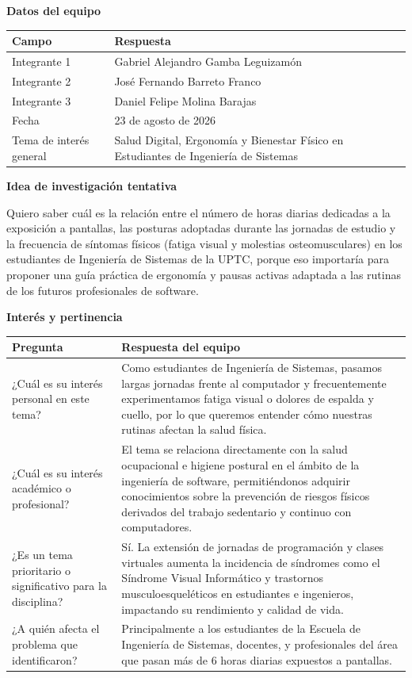 \documentclass[12pt,letterpaper]{article}
\begin{document}
\bigskip
\noindent\textbf{Datos del equipo}
\begin{center}
\begin{tabularx}{\textwidth}{L{5cm} X}
\toprule
\textbf{Campo} & \textbf{Respuesta}\\
\midrule
Integrante 1 & Gabriel Alejandro Gamba Leguizamón\\
Integrante 2 & José Fernando Barreto Franco\\
Integrante 3 & Daniel Felipe Molina Barajas\\
Fecha & 23 de agosto de 2026\\
Tema de interés general & Salud Digital, Ergonomía y Bienestar Físico en Estudiantes de Ingeniería de Sistemas\\
\bottomrule
\end{tabularx}
\end{center}

\bigskip
\noindent\textbf{Idea de investigación tentativa}

\noindent Quiero saber cuál es la relación entre el número de horas diarias
dedicadas a la exposición a pantallas, las posturas adoptadas durante las jornadas
de estudio y la frecuencia de síntomas físicos (fatiga visual y molestias
osteomusculares) en los estudiantes de Ingeniería de Sistemas de la UPTC, porque
eso importaría para proponer una guía práctica de ergonomía y pausas activas
adaptada a las rutinas de los futuros profesionales de software.

\bigskip
\noindent\textbf{Interés y pertinencia}
\begin{center}
\begin{tabularx}{\textwidth}{L{5.5cm} X}
\toprule
\textbf{Pregunta} & \textbf{Respuesta del equipo}\\
\midrule
¿Cuál es su interés personal en este tema? & Como estudiantes de Ingeniería de Sistemas, pasamos largas jornadas frente al computador y frecuentemente experimentamos fatiga visual o dolores de espalda y cuello, por lo que queremos entender cómo nuestras rutinas afectan la salud física.\\
¿Cuál es su interés académico o profesional? & El tema se relaciona directamente con la salud ocupacional e higiene postural en el ámbito de la ingeniería de software, permitiéndonos adquirir conocimientos sobre la prevención de riesgos físicos derivados del trabajo sedentario y continuo con computadores.\\
¿Es un tema prioritario o significativo para la disciplina? & Sí. La extensión de jornadas de programación y clases virtuales aumenta la incidencia de síndromes como el Síndrome Visual Informático y trastornos musculoesqueléticos en estudiantes e ingenieros, impactando su rendimiento y calidad de vida.\\
¿A quién afecta el problema que identificaron? & Principalmente a los estudiantes de la Escuela de Ingeniería de Sistemas, docentes, y profesionales del área que pasan más de 6 horas diarias expuestos a pantallas.\\
\bottomrule
\end{tabularx}
\end{center}
\end{document}
